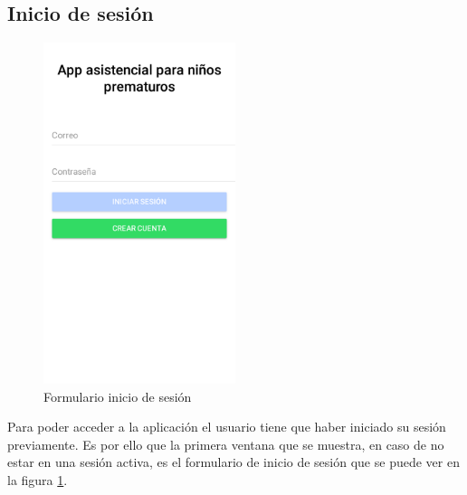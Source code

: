 \subsection{Inicio de sesión}
\begin{figure}[!h]
    \centering
    \includegraphics[width=0.5\textwidth]{images/screenshots/Pantalla-inicial.png}
    \caption{Formulario inicio de sesión}
    \label{formulario-inicio-sesion}
\end{figure}

Para poder acceder a la aplicación el usuario tiene que haber iniciado su
sesión previamente. Es por ello que la primera ventana que se muestra, en caso
de no estar en una sesión activa, es el formulario de inicio de sesión que se
puede ver en la figura \ref{formulario-inicio-sesion}.
\clearpage

